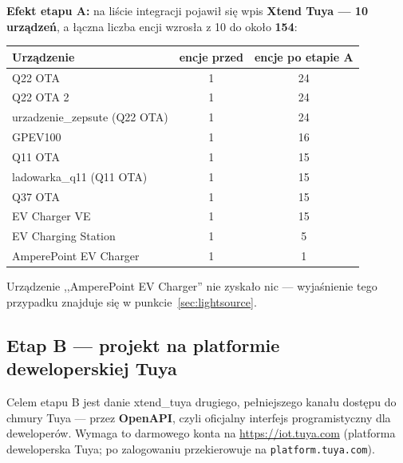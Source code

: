 \documentclass[11pt,a4paper]{article}
\begin{document}
\textbf{Efekt etapu A:} na liście integracji pojawił się wpis \textbf{Xtend Tuya --- 10 urządzeń}, a łączna liczba encji wzrosła z 10 do około \textbf{154}:

\begin{center}
\begin{tabular}{lcc}
\toprule
\textbf{Urządzenie} & \textbf{encje przed} & \textbf{encje po etapie A}\\
\midrule
Q22 OTA & 1 & 24\\
Q22 OTA 2 & 1 & 24\\
urzadzenie\_zepsute (Q22 OTA) & 1 & 24\\
GPEV100 & 1 & 16\\
Q11 OTA & 1 & 15\\
ladowarka\_q11 (Q11 OTA) & 1 & 15\\
Q37 OTA & 1 & 15\\
EV Charger VE & 1 & 15\\
EV Charging Station & 1 & 5\\
AmperePoint EV Charger & 1 & 1\\
\bottomrule
\end{tabular}
\end{center}

Urządzenie ,,AmperePoint EV Charger'' nie zyskało nic --- wyjaśnienie tego przypadku znajduje się w punkcie~\ref{sec:lightsource}.

\subsection{Etap B --- projekt na platformie deweloperskiej Tuya}

Celem etapu B jest danie xtend\_tuya drugiego, pełniejszego kanału dostępu do chmury Tuya --- przez \textbf{OpenAPI}, czyli oficjalny interfejs programistyczny dla deweloperów. Wymaga to darmowego konta na \url{https://iot.tuya.com} (platforma deweloperska Tuya; po zalogowaniu przekierowuje na \texttt{platform.tuya.com}).
\end{document}
